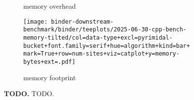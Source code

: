 \begin{figure*}

\begin{subfigure}{\linewidth}
    \centering
\resizebox{0.8\linewidth}{!}{%
%
}
\caption{memory overhead}
\label{fig:memory-supp:overhead}
\end{subfigure}

\begin{subfigure}{\linewidth}
\texttt{[image: binder-downstream-benchmark/binder/teeplots/2025-06-30-cpp-bench-memory-tilted/col=data-type+excl=pyrimidal-bucket+font.family=serif+hue=algorithm+kind=bar+mark=True+row=num-sites+viz=catplot+y=memory-bytes+ext=.pdf]}
\caption{memory footprint}
\label{fig:memory-supp:footprint}
\end{subfigure}

\caption{%
\textbf{TODO.}
\small
TODO.
}
\label{fig:memory-supp}
\end{figure*}
